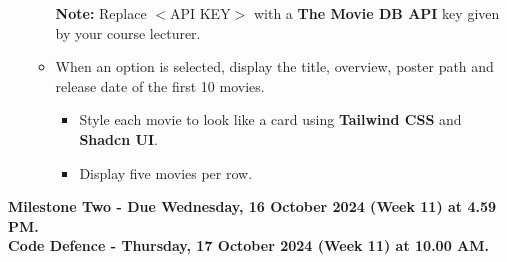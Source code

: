 \documentclass{article}
\begin{document}
\begin{itemize}
\begin{itemize}
\begin{itemize}
	\end{itemize}
	\textbf{Note:} Replace $<$API KEY$>$ with a \textbf{The Movie DB API} key given by your course lecturer.
	\item When an option is selected, display the title, overview, poster path and release date of the first 10 movies.
	\begin{itemize}
		\item Style each movie to look like a card using \textbf{Tailwind CSS} and \textbf{Shadcn UI}.
		\item Display five movies per row.
	\end{itemize}
	\end{itemize}
\end{itemize}
	\textbf{Milestone Two - Due Wednesday, 16 October 2024 (Week 11) at 4.59 PM. \\ Code Defence - Thursday, 17 October 2024 (Week 11) at 10.00 AM.}
\end{document}
